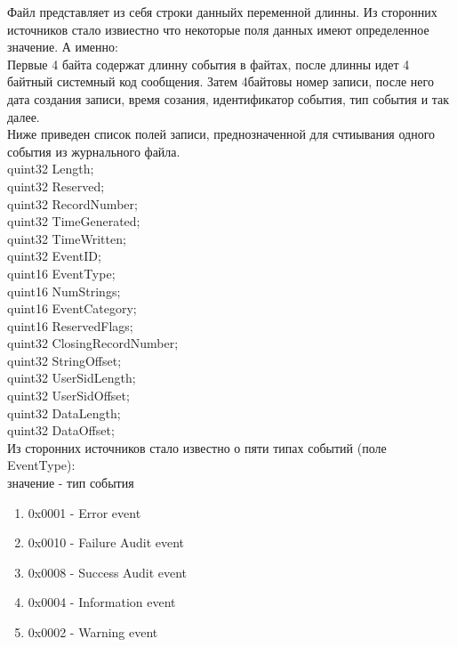 
Файл представляет из себя строки данныйх переменной длинны. Из сторонних источников стало извиестно что некоторые поля данных имеют определенное значение. А именно: \\
Первые 4 байта содержат длинну события в файтах, после длинны идет 4 байтный системный код сообщения. Затем 4байтовы номер записи, после него дата создания записи, время созания, идентификатор события, тип события и так далее. \\

Ниже приведен список полей записи, преднозначенной для счтиывания одного события из журнального файла. \\

	quint32 Length; \\
	quint32 Reserved; \\
	quint32 RecordNumber; \\
	quint32 TimeGenerated; \\
	quint32 TimeWritten; \\
	quint32 EventID; \\
	quint16 EventType; \\
	quint16 NumStrings; \\
	quint16 EventCategory; \\
	quint16 ReservedFlags; \\
	quint32 ClosingRecordNumber; \\
	quint32 StringOffset; \\
	quint32 UserSidLength; \\
	quint32 UserSidOffset; \\
	quint32 DataLength; \\
	quint32 DataOffset; \\

Из сторонних источников стало известно о пяти типах событий (поле EventType): \\

значение - тип события \\

\begin{enumerate}
\item 0x0001 - Error event
\item 0x0010 - Failure Audit event
\item 0x0008 - Success Audit event
\item 0x0004 - Information event
\item 0x0002 - Warning event
\end{enumerate}

